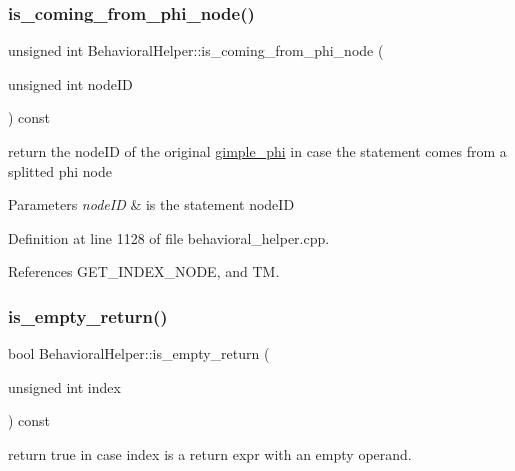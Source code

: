 \subsubsection{\texorpdfstring{is\+\_\+coming\+\_\+from\+\_\+phi\+\_\+node()}{is\_coming\_from\_phi\_node()}}
{\footnotesize\ttfamily unsigned int Behavioral\+Helper\+::is\+\_\+coming\+\_\+from\+\_\+phi\+\_\+node (\begin{DoxyParamCaption}\item[{unsigned int}]{node\+ID }\end{DoxyParamCaption}) const\hspace{0.3cm}{\ttfamily [virtual]}}



return the node\+ID of the original \hyperlink{structgimple__phi}{gimple\+\_\+phi} in case the statement comes from a splitted phi node 


\begin{DoxyParams}{Parameters}
{\em node\+ID} & is the statement node\+ID \\
\hline
\end{DoxyParams}


Definition at line 1128 of file behavioral\+\_\+helper.\+cpp.



References G\+E\+T\+\_\+\+I\+N\+D\+E\+X\+\_\+\+N\+O\+DE, and TM.

\mbox{\label{classBehavioralHelper_aa8b995dc2f276d29354a6c8bd8d6da3d}} 
\subsubsection{\texorpdfstring{is\+\_\+empty\+\_\+return()}{is\_empty\_return()}}
{\footnotesize\ttfamily bool Behavioral\+Helper\+::is\+\_\+empty\+\_\+return (\begin{DoxyParamCaption}\item[{unsigned int}]{index }\end{DoxyParamCaption}) const\hspace{0.3cm}{\ttfamily [virtual]}}



return true in case index is a return expr with an empty operand. 



